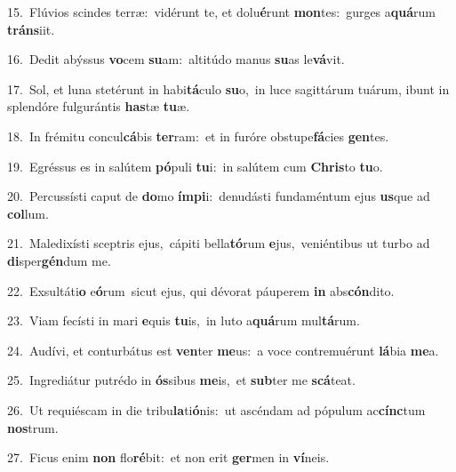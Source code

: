 {\numbfont\textcolor{\numbcolor}{15.}}~Flúvios scindes terræ:~\dagger vidérunt te, et dolu\-\textbf{é}\-runt \textbf{mon}\-tes:~\star gurges a\-\textbf{quá}\-rum \textbf{tráns}\-iit.\par
{\numbfont\textcolor{\numbcolor}{16.}}~Dedit abýssus \textbf{vo}\-cem \textbf{su}\-am:~\star altitúdo manus \textbf{su}\-as le\-\textbf{vá}\-vit.\par
{\numbfont\textcolor{\numbcolor}{17.}}~Sol, et luna stetérunt in habi\-\textbf{tá}\-culo \textbf{su}\-o,~\star in luce sagittárum tuárum, ibunt in splendóre fulgurántis \textbf{has}\-tæ \textbf{tu}\-æ.\par
{\numbfont\textcolor{\numbcolor}{18.}}~In frémitu concul\-\textbf{cá}\-bis \textbf{ter}\-ram:~\star et in furóre obstupe\-\textbf{fá}\-cies \textbf{gen}\-tes.\par
{\numbfont\textcolor{\numbcolor}{19.}}~Egréssus es in salútem \textbf{pó}\-puli \textbf{tu}\-i:~\star in salútem cum \textbf{Chris}\-to \textbf{tu}\-o.\par
{\numbfont\textcolor{\numbcolor}{20.}}~Percussísti caput de \textbf{do}\-mo \textbf{ím}\-\textbf{pi}i:~\star denudásti fundaméntum ejus \textbf{us}\-que ad \textbf{col}\-lum.\par
{\numbfont\textcolor{\numbcolor}{21.}}~Maledixísti sceptris ejus,~\dagger cápiti bella\-\textbf{tó}\-rum \textbf{e}\-jus,~\star veniéntibus ut turbo ad \textbf{di}\-sper\-\textbf{gén}\-dum me.\par
{\numbfont\textcolor{\numbcolor}{22.}}~Exsultáti\textbf{o} e\-\textbf{ó}\-rum~\star sicut ejus, qui dévorat páuperem \textbf{in} abs\-\textbf{cón}\-dito.\par
{\numbfont\textcolor{\numbcolor}{23.}}~Viam fecísti in mari \textbf{e}\-quis \textbf{tu}\-is,~\star in luto a\-\textbf{quá}\-rum mul\-\textbf{tá}\-rum.\par
{\numbfont\textcolor{\numbcolor}{24.}}~Audívi, et conturbátus est \textbf{ven}\-ter \textbf{me}\-us:~\star a voce contremuérunt \textbf{lá}\-bia \textbf{me}\-a.\par
{\numbfont\textcolor{\numbcolor}{25.}}~Ingrediátur putrédo in \textbf{ós}\-sibus \textbf{me}\-is,~\star et \textbf{sub}\-ter me \textbf{scá}\-teat.\par
{\numbfont\textcolor{\numbcolor}{26.}}~Ut requiéscam in die tribu\-\textbf{la}\-ti\-\textbf{ó}\-nis:~\star ut ascéndam ad pópulum ac\-\textbf{cínc}\-tum \textbf{nos}\-trum.\par
{\numbfont\textcolor{\numbcolor}{27.}}~Ficus enim \textbf{non} flo\-\textbf{ré}\-bit:~\star et non erit \textbf{ger}\-men in \textbf{ví}\-neis.\par

